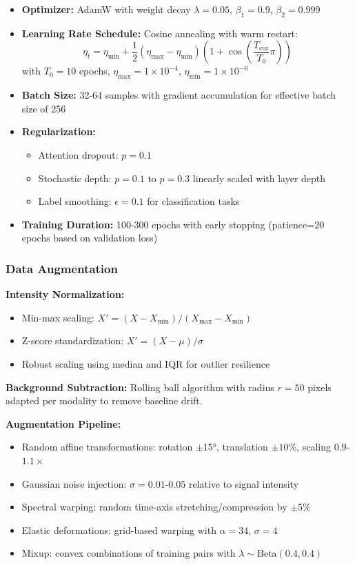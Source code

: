 \documentclass[12pt,a4paper]{article}
\begin{document}
\begin{itemize}
    \item \textbf{Optimizer:} AdamW with weight decay $\lambda=0.05$, $\beta_1=0.9$, $\beta_2=0.999$
    \item \textbf{Learning Rate Schedule:} Cosine annealing with warm restart:
    \begin{equation}
    \eta_t = \eta_{\min} + \frac{1}{2}(\eta_{\max} - \eta_{\min})\left(1 + \cos\left(\frac{T_{\text{cur}}}{T_0}\pi\right)\right)
    \end{equation}
    with $T_0=10$ epochs, $\eta_{\max}=1 \times 10^{-4}$, $\eta_{\min}=1 \times 10^{-6}$
    \item \textbf{Batch Size:} 32-64 samples with gradient accumulation for effective batch size of 256
    \item \textbf{Regularization:} 
    \begin{itemize}
        \item Attention dropout: $p=0.1$
        \item Stochastic depth: $p=0.1$ to $p=0.3$ linearly scaled with layer depth
        \item Label smoothing: $\epsilon=0.1$ for classification tasks
    \end{itemize}
    \item \textbf{Training Duration:} 100-300 epochs with early stopping (patience=20 epochs based on validation loss)
\end{itemize}

\subsubsection{Data Augmentation}

\textbf{Intensity Normalization:}
\begin{itemize}
    \item Min-max scaling: $X' = (X - X_{\min}) / (X_{\max} - X_{\min})$
    \item Z-score standardization: $X' = (X - \mu) / \sigma$
    \item Robust scaling using median and IQR for outlier resilience
\end{itemize}

\textbf{Background Subtraction:} Rolling ball algorithm with radius $r=50$ pixels adapted per modality to remove baseline drift.

\textbf{Augmentation Pipeline:}
\begin{itemize}
    \item Random affine transformations: rotation $\pm 15°$, translation $\pm 10\%$, scaling $0.9$-$1.1\times$
    \item Gaussian noise injection: $\sigma=0.01$-$0.05$ relative to signal intensity
    \item Spectral warping: random time-axis stretching/compression by $\pm 5\%$
    \item Elastic deformations: grid-based warping with $\alpha=34$, $\sigma=4$
    \item Mixup: convex combinations of training pairs with $\lambda \sim \text{Beta}(0.4, 0.4)$
\end{itemize}
\end{document}
